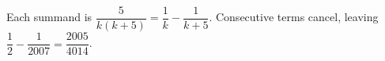 Each summand is $\dfrac{5}{k(k+5)}=\dfrac{1}{k}-\dfrac{1}{k+5}$. Consecutive terms cancel, leaving $\dfrac{1}{2}-\dfrac{1}{2007}=\boxed{\dfrac{2005}{4014}}$.

